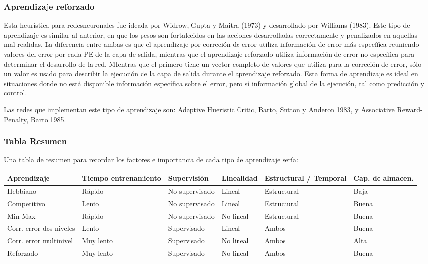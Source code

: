 \subsubsection{Aprendizaje reforzado}

Esta heurística para redesneuronales fue ideada por Widrow, Gupta y Maitra
(1973) y desarrollado por Williams (1983). Este tipo de aprendizaje es similar
al anterior, en que los pesos son fortalecidos en las acciones desarrolladas
correctamente y penalizados en aquellas mal realidas. La diferencia entre ambas
es que el aprendizaje por correción de error utiliza información de error más
específica reuniendo valores del error por cada PE de la capa de salida,
mientras que el aprendizaje reforzado utiliza información de error no
específica para determinar el desarrollo de la red. MIentras que el primero
tiene un vector completo de valores que utiliza para la correción de error,
sólo un valor es usado para describir la ejecución de la capa de salida durante
el aprendizaje reforzado. Esta forma de aprendizaje es ideal en situaciones
donde no está disponible información específica sobre el error, pero sí
información global de la ejecución, tal como predicción y control.

Las redes que implementan este tipo de aprendizaje son: Adaptive Hueristic
Critic, Barto, Sutton y Anderon 1983, y Associative Reward-Penalty, Barto 1985.

\subsubsection{Tabla Resumen}

Una tabla de resumen para recordar los factores e importancia de cada tipo de aprendizaje sería:

\begin{tabularx}{\textwidth}{|X|X|X|X|X|X|}
	\hline 
	Aprendizaje	& Tiempo entrenamiento	& Supervisión			& Linealidad	& Estructural / Temporal	& Cap. de almacen. \\
	\hline 
	Hebbiano 	& Rápido		& No supervisado		& Lineal	& Estructural			& Baja	\\
	Competitivo	& Lento			& No supervisado		& Lineal	& Estructural			& Buena	\\
	Min-Max		& Rápido		& No supervisado		& No lineal	& Estructural			& Buena	\\
	Corr. error dos niveles & Lento		& Supervisado			& Lineal	& Ambos				& Buena	\\
	Corr. error multinivel & Muy lento	& Supervisado			& No lineal	& Ambos				& Alta	\\
	Reforzado	& Muy lento		& Supervisado			& No lineal	& Ambos				& Buena \\
	\hline 	
\end{tabularx}


